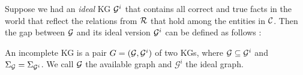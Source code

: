 


Suppose we had an \emph{ideal} KG $\mathcal{G}^i$ that contains all correct and true facts in the world that reflect the relations from $\mathcal{R}$ that hold among the entities in $\mathcal{C}$. Then the gap between $\mathcal{G}$ and its ideal version $\mathcal{G}^i$ can be defined as follows \cite{rdfcomp}: 

\begin{definition} An incomplete KG is a pair
    $G = (\mathcal{G}, \mathcal{G}^i)$ of two KGs, where $\mathcal{G}\subseteq \mathcal{G}^i$ and
    $\Sigma_{\mathcal{G}}=\Sigma_{\mathcal{G}^i}$. We call $\mathcal{G}$ the available
    graph and $\mathcal{G}^i$ the ideal graph.  \end{definition}
    

